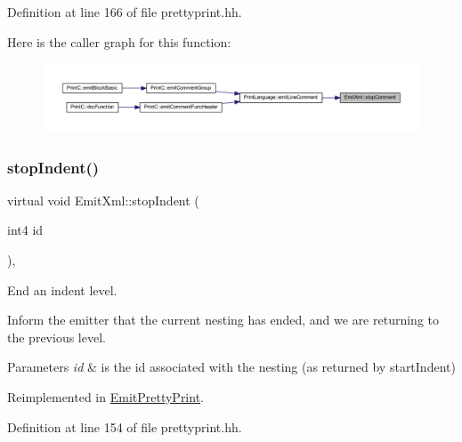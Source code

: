 Definition at line 166 of file prettyprint.\+hh.

Here is the caller graph for this function\+:
\nopagebreak
\begin{figure}[H]
\begin{center}
\leavevmode
\includegraphics[width=350pt]{class_emit_xml_abd12549a4f041d4358064a452ded5301_icgraph}
\end{center}
\end{figure}
\mbox{\label{class_emit_xml_a87ee3be19fea009ca1191a252a7c91ce}} 
\subsubsection{\texorpdfstring{stopIndent()}{stopIndent()}}
{\footnotesize\ttfamily virtual void Emit\+Xml\+::stop\+Indent (\begin{DoxyParamCaption}\item[{int4}]{id }\end{DoxyParamCaption})\hspace{0.3cm}{\ttfamily [inline]}, {\ttfamily [virtual]}}



End an indent level. 

Inform the emitter that the current nesting has ended, and we are returning to the previous level. 
\begin{DoxyParams}{Parameters}
{\em id} & is the id associated with the nesting (as returned by start\+Indent) \\
\hline
\end{DoxyParams}


Reimplemented in \mbox{\hyperlink{class_emit_pretty_print_a9804f4ea2076b47333f02697b23e77f2}{Emit\+Pretty\+Print}}.



Definition at line 154 of file prettyprint.\+hh.

